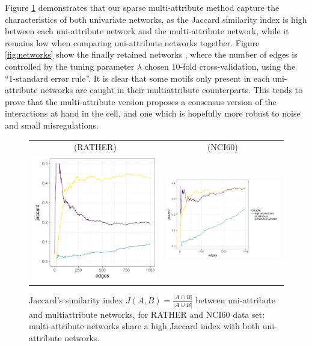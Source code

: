 Figure \ref{fig:jaccard} demonstrates that our sparse multi-attribute
method capture the characteristics of both univariate networks, as the
Jaccard similarity index is high between each uni-attribute network
and the multi-attribute network, while it remains low when comparing
uni-attribute networks together. Figure \ref{fig:networks} show the
finally retained networks , where the number of edges is controlled by
the tuning parameter $\lambda$ chosen 10-fold cross-validation, using
the ``1-standard error rule''. It is clear that some motifs only
present in each uni-attribute networks are caught in their
multiattribute counterparts. This tends to prove that the
multi-attribute version proposes a consensus version of the
interactions at hand in the cell, and one which is hopefully more
robust to noise and small misregulations.
\begin{figure}[htbp!]
  \centering
  \begin{tabular}{@{}cc@{}}
   (RATHER) & (NCI60) \\
    \includegraphics[width=.4\textwidth]{figures/jaccard_RATHER}
  & \includegraphics[width=.57\textwidth]{figures/jaccard_NCI60}
  \end{tabular}
  \caption{Jaccard's similarity index
    $J(A,B) = \frac{\left|A\cap B\right|}{\left|A\cup B\right|}$
    between uni-attribute and multiattribute networks, for RATHER and
    NCI60 data set: multi-attribute networks share a high Jaccard
    index with both uni-attribute networks.}
  \label{fig:jaccard}
\end{figure}

